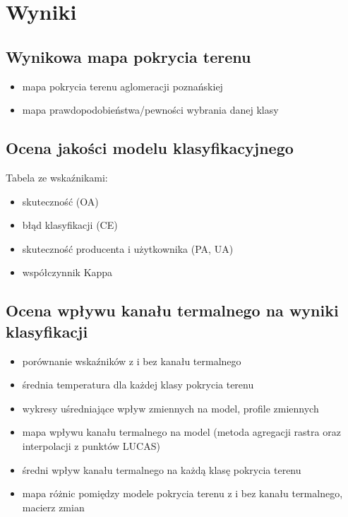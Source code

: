 \documentclass{amuthesis}
\begin{document}

\hypertarget{sec-wyniki}{%
\chapter{Wyniki}\label{sec-wyniki}}

\hypertarget{sec-mapa}{%
\section{Wynikowa mapa pokrycia terenu}\label{sec-mapa}}

\begin{itemize}
\item
  mapa pokrycia terenu aglomeracji poznańskiej
\item
  mapa prawdopodobieństwa/pewności wybrania danej klasy
\end{itemize}

\hypertarget{sec-ocena}{%
\section{Ocena jakości modelu klasyfikacyjnego}\label{sec-ocena}}

Tabela ze wskaźnikami:

\begin{itemize}
\item
  skuteczność (OA)
\item
  błąd klasyfikacji (CE)
\item
  skuteczność producenta i użytkownika (PA, UA)
\item
  współczynnik Kappa
\end{itemize}

\hypertarget{sec-wplyw}{%
\section{Ocena wpływu kanału termalnego na wyniki
klasyfikacji}\label{sec-wplyw}}

\begin{itemize}
\item
  porównanie wskaźników z i bez kanału termalnego
\item
  średnia temperatura dla każdej klasy pokrycia terenu
\item
  wykresy uśredniające wpływ zmiennych na model, profile zmiennych
\item
  mapa wpływu kanału termalnego na model (metoda agregacji rastra oraz
  interpolacji z punktów LUCAS)
\item
  średni wpływ kanału termalnego na każdą klasę pokrycia terenu
\item
  mapa różnic pomiędzy modele pokrycia terenu z i bez kanału termalnego,
  macierz zmian
\end{itemize}
\end{document}
